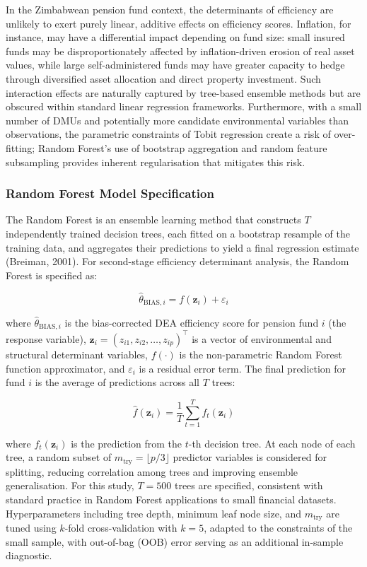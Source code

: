 \documentclass[12pt,a4paper]{article}
\begin{document}
In the Zimbabwean pension fund context, the determinants of efficiency are unlikely to exert purely linear, additive effects on efficiency scores. Inflation, for instance, may have a differential impact depending on fund size: small insured funds may be disproportionately affected by inflation-driven erosion of real asset values, while large self-administered funds may have greater capacity to hedge through diversified asset allocation and direct property investment. Such interaction effects are naturally captured by tree-based ensemble methods but are obscured within standard linear regression frameworks. Furthermore, with a small number of DMUs and potentially more candidate environmental variables than observations, the parametric constraints of Tobit regression create a risk of over-fitting; Random Forest's use of bootstrap aggregation and random feature subsampling provides inherent regularisation that mitigates this risk.

\subsubsection{Random Forest Model Specification}

The Random Forest is an ensemble learning method that constructs $T$ independently trained decision trees, each fitted on a bootstrap resample of the training data, and aggregates their predictions to yield a final regression estimate (Breiman, 2001). For second-stage efficiency determinant analysis, the Random Forest is specified as:

\begin{equation}
    \hat{\theta}_{\text{BIAS},i} = f(\mathbf{z}_i) + \varepsilon_i
\end{equation}

where $\hat{\theta}_{\text{BIAS},i}$ is the bias-corrected DEA efficiency score for pension fund $i$ (the response variable), $\mathbf{z}_i = (z_{i1}, z_{i2}, \ldots, z_{ip})^{\top}$ is a vector of environmental and structural determinant variables, $f(\cdot)$ is the non-parametric Random Forest function approximator, and $\varepsilon_i$ is a residual error term. The final prediction for fund $i$ is the average of predictions across all $T$ trees:

\begin{equation}
    \hat{f}(\mathbf{z}_i) = \frac{1}{T} \sum_{t=1}^{T} f_t(\mathbf{z}_i)
\end{equation}

where $f_t(\mathbf{z}_i)$ is the prediction from the $t$-th decision tree. At each node of each tree, a random subset of $m_{\text{try}} = \lfloor p/3 \rfloor$ predictor variables is considered for splitting, reducing correlation among trees and improving ensemble generalisation. For this study, $T = 500$ trees are specified, consistent with standard practice in Random Forest applications to small financial datasets. Hyperparameters including tree depth, minimum leaf node size, and $m_{\text{try}}$ are tuned using $k$-fold cross-validation with $k = 5$, adapted to the constraints of the small sample, with out-of-bag (OOB) error serving as an additional in-sample diagnostic.
\end{document}
